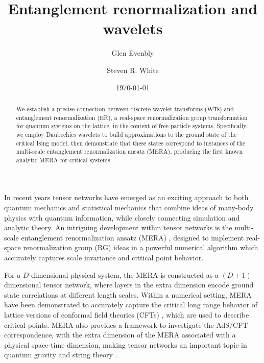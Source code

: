 \documentclass[aps,prl,twocolumn,showpacs,superscriptaddress,floatfix,10pt]{revtex4-1}
\begin{document}
\title{Entanglement renormalization and wavelets}

\author{Glen Evenbly}
\author{Steven R. White}
\date{\today}

\begin{abstract}
We establish a precise connection between discrete wavelet transforms (WTs) and entanglement renormalization (ER), a real-space renormalization group
transformation for quantum systems on the lattice, in the context of free
particle systems. Specifically, we employ Daubechies wavelets to build
approximations to the ground state of the critical Ising model, then
demonstrate that these states correspond to instances of the multi-scale
entanglement renormalization ansatz (MERA), producing the first known analytic MERA for critical systems.  
\end{abstract}

\maketitle
In recent years tensor networks \cite{TNS} have emerged as an exciting
approach to both quantum mechanics and statistical mechanics that
combine ideas of many-body physics with quantum information, while
closely connecting simulation and analytic theory. An intriguing development
within tensor networks is the multi-scale entanglement renormalization ansatz
(MERA) \cite{ER,MERA}, designed to implement real-space renormalization group
(RG) \cite{RGreview} ideas in a powerful numerical algorithm which accurately
captures scale invariance and critical point behavior.

For a $D$-dimensional physical system, the MERA is constructed as a $(D+1)$-dimensional
tensor network, where layers in the extra dimension encode ground state correlations at different length scales. Within 
a numerical setting, MERA have been 
demonstrated \cite{MERAlocal, MERAnonlocal, MERAbook, Alg1, Alg2, MERAapp1, MERAapp2, MERAapp3} to 
accurately capture the critical long range behavior of lattice versions of
conformal field theories (CFTs) \cite{CFTbook1,CFTbook2}, 
which are used to describe critical points. MERA also provides a framework to investigate the AdS/CFT correspondence, with the
extra dimension of the MERA associated with a physical space-time
dimension, making tensor networks an important topic in quantum
gravity and string theory \cite{Holo1,Holo2}.
\end{document}
